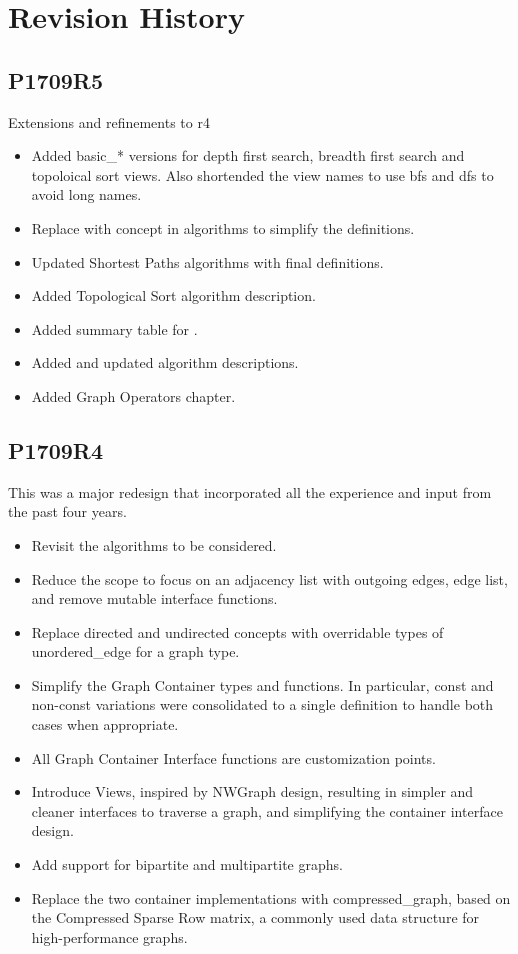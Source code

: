 \chapter*{Revision History}
\section*{P1709R5}
Extensions and refinements to r4
\begin{itemize}
\item Added basic\_* versions for depth first search, breadth first search and topoloical sort views. Also shortended the view names to use bfs and dfs to avoid long names.
\item Replace  with  concept in algorithms to simplify the definitions.
\item Updated Shortest Paths algorithms with final definitions.
\item Added Topological Sort algorithm description.
\item Added summary table for .
\item Added and updated algorithm descriptions.
\item Added Graph Operators chapter.
\end{itemize}

\section*{P1709R4}
This was a major redesign that incorporated all the experience and input from the past four years.
\begin{itemize}
\item Revisit the algorithms to be considered.
\item Reduce the scope to focus on an adjacency list with outgoing edges, edge list, and remove mutable interface functions. 
\item Replace directed and undirected concepts with overridable types of unordered\_edge for a graph type.
\item Simplify the Graph Container types and functions. In particular, const and non-const variations were consolidated to a single definition to handle both cases 
when appropriate.
\item All Graph Container Interface functions are customization points.
\item Introduce Views, inspired by NWGraph design, resulting in simpler and cleaner interfaces to traverse a graph, and simplifying the container interface design.
\item Add support for bipartite and multipartite graphs.
\item Replace the two container implementations with compressed\_graph, based on the Compressed Sparse Row matrix, a commonly used 
      data structure for high-performance graphs.
\end{itemize}

